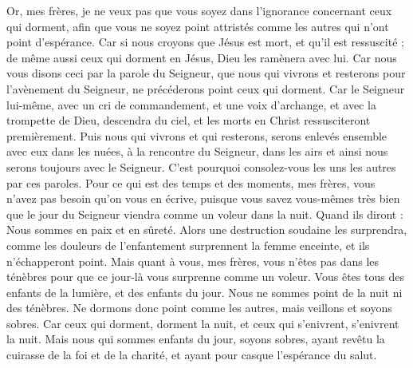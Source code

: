 \begin{multicols}{2}
Or, mes frères, je ne veux pas que vous soyez dans l'ignorance concernant ceux qui dorment, afin que vous ne soyez point attristés comme les autres qui n'ont point d'espérance. 
Car si nous croyons que Jésus est mort, et qu'il est ressuscité ; de même aussi ceux qui dorment en Jésus, Dieu les ramènera avec lui.
Car nous vous disons ceci par la parole du Seigneur, que nous qui vivrons et resterons pour l'avènement du Seigneur, ne précéderons point ceux qui dorment.
Car le Seigneur lui-même, avec un cri de commandement, et une voix d'archange, et avec la trompette de Dieu, descendra du ciel, et les morts en Christ ressusciteront premièrement.
Puis nous qui vivrons et qui resterons, serons enlevés ensemble avec eux dans les nuées, à la rencontre du Seigneur, dans les airs et ainsi nous serons toujours avec le Seigneur. 
C'est pourquoi consolez-vous les uns les autres par ces paroles.
\VerseOne{}Pour ce qui est des temps et des moments, mes frères, vous n'avez pas besoin qu'on vous en écrive,
puisque vous savez vous-mêmes très bien que le jour du Seigneur viendra comme un voleur dans la nuit.
Quand ils diront : Nous sommes en paix et en sûreté. Alors une destruction soudaine les surprendra, comme les douleurs de l'enfantement surprennent la femme enceinte, et ils n'échapperont point.
Mais quant à vous, mes frères, vous n'êtes pas dans les ténèbres pour que ce jour-là vous surprenne comme un voleur.
Vous êtes tous des enfants de la lumière, et des enfants du jour. Nous ne sommes point de la nuit ni des ténèbres.
Ne dormons donc point comme les autres, mais veillons et soyons sobres.
Car ceux qui dorment, dorment la nuit, et ceux qui s'enivrent, s'enivrent la nuit.
Mais nous qui sommes enfants du jour, soyons sobres, ayant revêtu la cuirasse de la foi et de la charité, et ayant pour casque l'espérance du salut.

\end{multicols}
